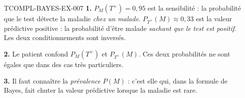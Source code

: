 \begin{corrige}{TCOMPL-BAYES-EX-007}
\textbf{1.} $P_M(T^+)=0{,}95$ est la sensibilité : la probabilité que le test
détecte la maladie \emph{chez un malade}. $P_{T^+}(M)\approx0{,}33$ est la
valeur prédictive positive : la probabilité d'être malade \emph{sachant que le
test est positif}. Les deux conditionnements sont inversés.

\textbf{2.} Le patient confond $P_M(T^+)$ et $P_{T^+}(M)$. Ces deux
probabilités ne sont égales que dans des cas très particuliers.

\textbf{3.} Il faut connaître la \emph{prévalence} $P(M)$ : c'est elle qui,
dans la formule de Bayes, fait chuter la valeur prédictive lorsque la maladie
est rare.
\end{corrige}
